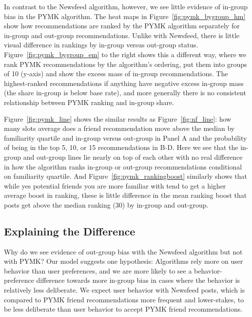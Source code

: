 \documentclass[12pt,letterpaper]{article}
\begin{document}
In contrast to the Newsfeed algorithm, however, we see little evidence of in-group bias in the PYMK algorithm. The heat maps in Figure~\ref{fig:pymk_bygroup_hm} show how recommendations are ranked by the PYMK algorithm separately for in-group and out-group recommendations. Unlike with Newsfeed, there is little visual difference in rankings by in-group versus out-group status. Figure~\ref{fig:pymk_bygroup_em} to the right shows this a different way, where we rank PYMK recommendations by the algorithm's ordering, put them into groups of 10 (y-axis) and show the excess mass of in-group recommendations. The highest-ranked recommendations if anything have negative excess in-group mass (the share in-group is below base rate), and more generally there is no consistent relationship between PYMK ranking and in-group share.

Figure~\ref{fig:pymk_line} shows the similar results as Figure~\ref{fig:nf_line}: how many slots average does a friend recommendation move above the median by familiarity quartile and in-group versus out-group in Panel A and the probability of being in the top 5, 10, or 15 recommendations in B-D. Here we see that the in-group and out-group lines lie nearly on top of each other with no real difference in how the algorithm ranks in-group or out-group recommendations conditional on familiarity quartile. And Figure~\ref{fig:pymk_rankingboost} similarly shows that while yes potential friends you are more familiar with tend to get a higher average boost in ranking, these is little difference in the mean ranking boost that posts get above the median ranking (30) by in-group and out-group. 

\subsection{Explaining the Difference}
Why do we see evidence of out-group bias with the Newsfeed algorithm but not with PYMK? Our model suggests one hypothesis: Algorithms rely more on user behavior than user preferences, and we are more likely to see a behavior-preference difference towards more in-group bias in cases where the behavior is relatively less deliberate. We expect user behavior with Newsfeed posts, which is compared to PYMK friend recommendations more frequent and lower-stakes, to be less deliberate than user behavior to accept PYMK friend recommendations. 
\end{document}
